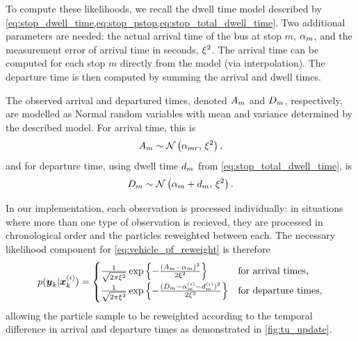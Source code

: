 To compute these likelihoods, we recall the dwell time model described by \cref{eq:stop_dwell_time,eq:stop_pstop,eq:stop_total_dwell_time}. Two additional parameters are needed: the actual arrival time of the bus at stop $m$, $\alpha_{m}$, and the measurement error of arrival time in seconds, $\xi^2$. The arrival time can be computed for each stop $m$ directly from the model (via interpolation). The departure time is then computed by summing the arrival and dwell times.


The observed arrival and departured times, denoted $A_m$ and $D_m$, respectively, are modelled as Normal random variables with mean and variance determined by the described model. For arrival time, this is
\begin{equation}
\label{eq:tu_arr_lhood}
A_m \sim \mathcal{N}\left(\alpha_{mr},\, \xi^2\right),
\end{equation}
and for departure time, using dwell time $d_m$ from \cref{eq:stop_total_dwell_time}, is
\begin{equation}
\label{eq:tu_dep_lhood}
D_m \sim \mathcal{N}\left(\alpha_m + d_m,\, \xi^2\right).
\end{equation}


In our \pf{} implementation, each observation is processed individually: in situations where more than one type of observation is recieved, they are processed in chronological order and the particles reweighted between each. The necessary likelihood component for \cref{eq:vehicle_pf_reweight} is therefore
\begin{equation}
\label{eq:tu_obs_lhood}
p(\boldsymbol{y}_k | \boldsymbol x^{(i)}_k) =
\begin{cases}
\frac{1}{\sqrt{2\pi\xi^2}}
    \exp\left\{
        -\frac{(A_m - \alpha_m)^2}{2\xi^2}
    \right\} & \text{for arrival times,} \\
\frac{1}{\sqrt{2\pi\xi^2}}
    \exp\left\{
        -\frac{(D_m - \alpha^{(i)}_m - d^{(i)}_m)^2}{2\xi^2}
    \right\} & \text{for departure times,}
\end{cases}
\end{equation}
allowing the particle sample to be reweighted according to the temporal difference in arrival and departure times as demonstrated in \cref{fig:tu_update}.

